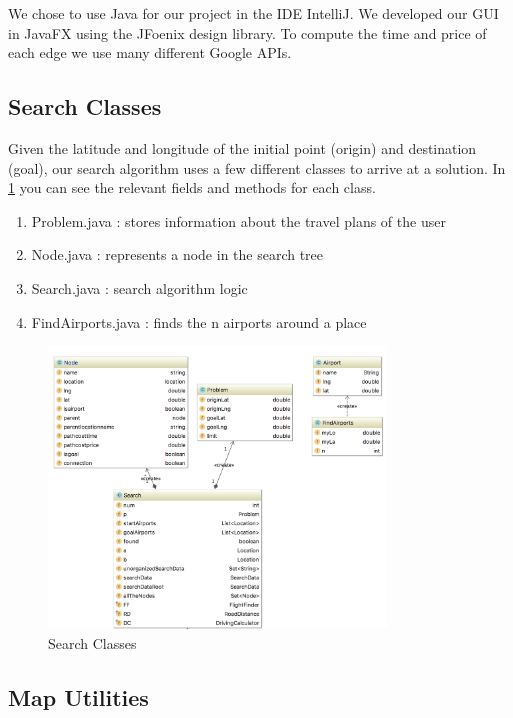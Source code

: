 \documentclass[11pt]{article}
\begin{document}
We chose to use Java for our project in the IDE IntelliJ. We developed our GUI in JavaFX using the JFoenix design library.
To compute the time and price of each edge we use many different Google APIs. 

\subsection{Search Classes}

Given the latitude and longitude of the initial point (origin) and destination (goal), our search algorithm uses a few different classes to arrive at a solution.
In \ref{fig:suml} you can see the relevant fields and methods for each class.
\begin{enumerate}
\item Problem.java : stores information about the travel plans of the user 
\item Node.java : represents a node in the search tree
\item Search.java : search algorithm logic
\item FindAirports.java : finds the n airports around a place
\end{enumerate}

\begin{figure}[!ht]
  \centering
  \includegraphics[width=0.8\textwidth]{searchuml.png}
  \caption{Search Classes}
  \label{fig:suml}
\end{figure}

\pagebreak

\subsection{Map Utilities}
\end{document}
